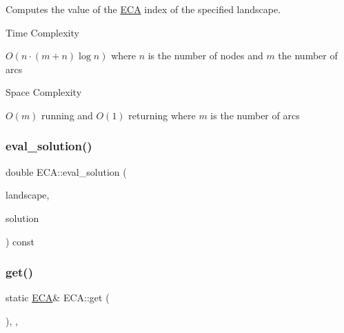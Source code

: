 Computes the value of the \hyperlink{class_e_c_a}{E\+CA} index of the specified landscape. 

\begin{DoxyRefDesc}{Time Complexity}
\item[\hyperlink{time__time000006}{Time Complexity}]$O(n \cdot (m + n) \log n)$ where $n$ is the number of nodes and $m$ the number of arcs \end{DoxyRefDesc}
\begin{DoxyRefDesc}{Space Complexity}
\item[\hyperlink{space__space000006}{Space Complexity}]$O(m)$ running and $O(1)$ returning where $m$ is the number of arcs \end{DoxyRefDesc}
\mbox{\label{class_e_c_a_ae4d2665232d2ff83b3f04f812c45c172}} 
\subsubsection{\texorpdfstring{eval\+\_\+solution()}{eval\_solution()}}
{\footnotesize\ttfamily double E\+C\+A\+::eval\+\_\+solution (\begin{DoxyParamCaption}\item[{const \hyperlink{class_landscape}{Landscape} \&}]{landscape,  }\item[{const \hyperlink{class_solution}{Solution} \&}]{solution }\end{DoxyParamCaption}) const}

\mbox{\label{class_e_c_a_ac7d3fd1b819ca2200c0eb6817d464323}} 
\subsubsection{\texorpdfstring{get()}{get()}}
{\footnotesize\ttfamily static \hyperlink{class_e_c_a}{E\+CA}\& E\+C\+A\+::get (\begin{DoxyParamCaption}{ }\end{DoxyParamCaption})\hspace{0.3cm}{\ttfamily [inline]}, {\ttfamily [static]}, {\ttfamily [noexcept]}}

\mbox{\label{class_e_c_a_ae39dbd10fc9c65479cbf6b7b09339590}} 
